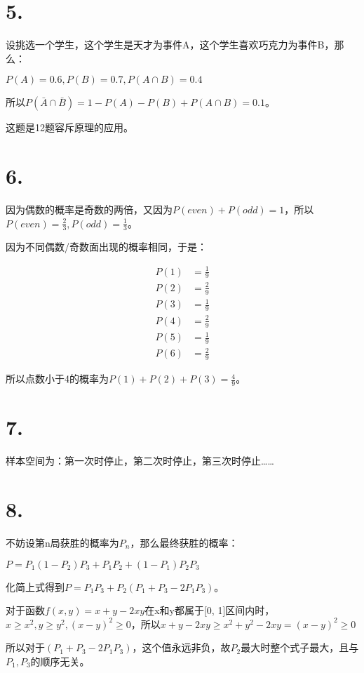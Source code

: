 \documentclass[UTF8]{article}
\begin{document}
    \section*{5.}
        设挑选一个学生，这个学生是天才为事件A，这个学生喜欢巧克力为事件B，那么：

        $P(A) = 0.6, P(B) = 0.7, P(A \cap B) = 0.4$

        所以$P(\bar A \cap \bar B) = 1 - P(A) - P(B) + P(A \cap B) = 0.1$。

        这题是12题容斥原理的应用。
    \section*{6.}
        因为偶数的概率是奇数的两倍，又因为$P(even) + P(odd) = 1$，所以$P(even) = \frac{2}{3}, P(odd) = \frac{1}{3}$。

        因为不同偶数/奇数面出现的概率相同，于是：

        $$\begin{array}{rcl}
            P(1) &= \frac{1}{9} \\
            P(2) &= \frac{2}{9} \\ 
            P(3) &= \frac{1}{9} \\ 
            P(4) &= \frac{2}{9} \\ 
            P(5) &= \frac{1}{9} \\
            P(6) &= \frac{2}{9}
        \end{array}$$

        所以点数小于4的概率为$P(1) + P(2) + P(3) = \frac{4}{9}$。
    \section*{7.}
        样本空间为：第一次时停止，第二次时停止，第三次时停止……
    \section*{8.}
        不妨设第n局获胜的概率为$P_n$，那么最终获胜的概率：
        
        $P = P_1(1 - P_2)P_3 + P_1P_2 + (1 - P_1)P_2P_3$

        化简上式得到$P = P_1P_3 + P_2(P_1 + P_3 - 2P_1P_3)$。

        对于函数$f(x, y) = x + y - 2xy$在x和y都属于[0, 1]区间内时，$x \geq x^2, y \geq y^2, (x - y)^2 \geq 0$，所以$x + y - 2xy \geq x^2 + y^2 -2xy = (x - y)^2 \geq 0$

        所以对于$(P_1 + P_3 - 2P_1P_3)$，这个值永远非负，故$P_2$最大时整个式子最大，且与$P_1,P_3$的顺序无关。
\end{document}
